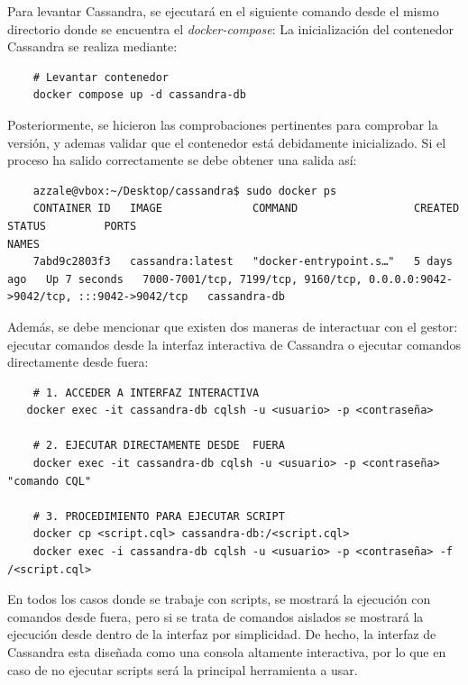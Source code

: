 \documentclass{article}
\begin{document}
Para levantar Cassandra, se ejecutará en el siguiente comando desde el mismo directorio donde se encuentra el \textit{docker-compose}:
La inicialización del contenedor Cassandra se realiza mediante:
\begin{lstlisting}
    # Levantar contenedor
    docker compose up -d cassandra-db
\end{lstlisting}

Posteriormente, se hicieron las comprobaciones pertinentes para comprobar la versión, y ademas validar que el contenedor está debidamente inicializado. Si el proceso ha salido correctamente se debe obtener una salida así:

\begin{tcolorbox}[colback=black, coltext=white, fontupper=\ttfamily, title=Terminal]
\begin{verbatim}
    azzale@vbox:~/Desktop/cassandra$ sudo docker ps
    CONTAINER ID   IMAGE              COMMAND                  CREATED      STATUS         PORTS                                                                          NAMES
    7abd9c2803f3   cassandra:latest   "docker-entrypoint.s…"   5 days ago   Up 7 seconds   7000-7001/tcp, 7199/tcp, 9160/tcp, 0.0.0.0:9042->9042/tcp, :::9042->9042/tcp   cassandra-db

\end{verbatim}
\end{tcolorbox}

Además, se debe mencionar que existen dos maneras de interactuar con el gestor: ejecutar comandos desde la interfaz interactiva de Cassandra o ejecutar comandos directamente desde fuera:
\begin{lstlisting}
    # 1. ACCEDER A INTERFAZ INTERACTIVA
   docker exec -it cassandra-db cqlsh -u <usuario> -p <contraseña>

    # 2. EJECUTAR DIRECTAMENTE DESDE  FUERA
    docker exec -it cassandra-db cqlsh -u <usuario> -p <contraseña> "comando CQL"

    # 3. PROCEDIMIENTO PARA EJECUTAR SCRIPT
    docker cp <script.cql> cassandra-db:/<script.cql>
    docker exec -i cassandra-db cqlsh -u <usuario> -p <contraseña> -f /<script.cql>
\end{lstlisting}

En todos los casos donde se trabaje con scripts, se mostrará la ejecución con comandos desde fuera, pero si se trata de comandos aislados se mostrará la ejecución desde dentro de la interfaz por simplicidad. De hecho, la interfaz de Cassandra esta diseñada como una consola altamente interactiva, por lo que en caso de no ejecutar scripts será la principal herramienta a usar.
\newline
\end{document}
